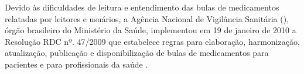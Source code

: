 Devido às dificuldades de leitura e entendimento das bulas de medicamentos relatadas por leitores e usuários, a Agência Nacional de Vigilância Sanitária (), órgão brasileiro do Ministério da Saúde, implementou em 19 de janeiro de 2010 a Resolução RDC nº. 47/2009 que estabelece regras para elaboração, harmonização, atualização, publicação e disponibilização de bulas de medicamentos para pacientes e para profissionais da saúde \cite{PORTALANVISA2019}.









